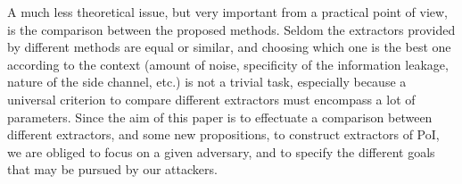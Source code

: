 A much less theoretical issue, but very important from a practical point of view, is the comparison between the proposed methods. Seldom the extractors provided by different methods are equal or similar, and choosing which one is the best one according to the context (amount of noise, specificity of the information leakage, nature of the side channel, etc.) is not a trivial task, especially because a universal criterion to compare different extractors must encompass a lot of parameters. 
Since the aim of this paper is to effectuate a comparison between different extractors, and some new propositions, to construct extractors of PoI, we are obliged to focus on a given adversary, and to specify the different goals that may be pursued by our attackers.





